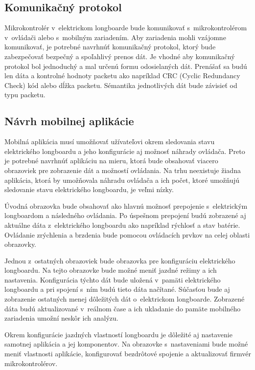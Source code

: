 \subsection{Komunikačný protokol}

Mikrokontrolér v~elektrickom longboarde bude komunikovať s~mikrokontrolérom v~ovládači alebo s~mobilným zariadením.
Aby zariadenia mohli vzájomne komunikovať, je potrebné navrhnúť komunikačný protokol, ktorý bude zabezpečovať bezpečný a spoľahlivý prenos dát.
Je vhodné aby komunikačný protokol bol jednoduchý a mal určenú formu odosielaných dát.
Prenášať sa budú len dáta a kontrolné hodnoty packetu ako napríklad CRC (Cyclic Redundancy Check) kód alebo dĺžka packetu.
Sémantika jednotlivých dát bude závisieť od typu packetu.

\subsection{Návrh mobilnej aplikácie}

Mobilná aplikácia musí umožňovať užívateľovi okrem sledovania stavu elektrického longboardu a jeho konfigurácie aj možnosť náhrady ovládača.
Preto je potrebné navrhnúť aplikáciu na mieru, ktorá bude obsahovať viacero obrazoviek pre zobrazenie dát a možností ovládania.
Na trhu neexistuje žiadna aplikácia, ktorá by umožňovala náhradu ovládača a ich počet, ktoré umožňujú sledovanie stavu elektrického longboardu, je veľmi nízky.

Úvodná obrazovka bude obsahovať ako hlavnú možnosť prepojenie s~elektrickým longboardom a následného ovládania.
Po úspešnom prepojení budú zobrazené aj aktuálne dáta z~elektrického longboardu ako napríklad rýchlosť a stav batérie.
Ovládanie zrýchlenia a brzdenia bude pomocou ovládacích prvkov na celej oblasti obrazovky.

Jednou z~ostatných obrazoviek bude obrazovka pre konfiguráciu elektrického longboardu.
Na tejto obrazovke bude možné meniť jazdné režimy a ich nastavenia.
Konfigurácia týchto dát bude uložená v~pamäti elektrického longboardu a pri spojení s~ním budú tieto dáta načítané.
Súčasťou bude aj zobrazenie ostatných menej dôležitých dát o~elektrickom longboarde.
Zobrazené dáta budú aktualizované v~reálnom čase a ich ukladanie do pamäte mobilného zariadenia umožní neskôr ich analýzu.

Okrem konfigurácie jazdných vlastností longboardu je dôležité aj nastavenie samotnej aplikácia a jej komponentov.
Na obrazovke s~nastaveniami bude možné meniť vlastnosti aplikácie, konfigurovať bezdrôtové spojenie a aktualizovať firmvér mikrokontrolérov.

